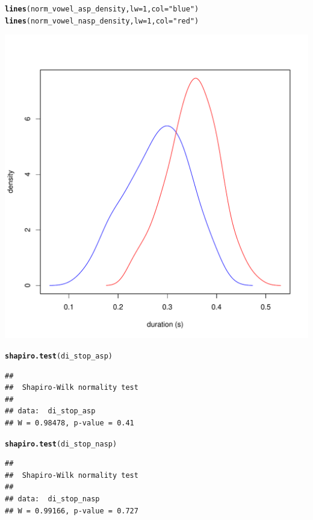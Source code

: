 \documentclass[a4paper,11pt]{article}\usepackage[]{graphicx}\usepackage[]{color}
\makeatletter
\def\maxwidth{ %
  \ifdim\Gin@nat@width>\linewidth
    \linewidth
  \else
    \Gin@nat@width
  \fi
}
\newcommand{\hlnum}[1]{\textcolor[rgb]{0.686,0.059,0.569}{#1}}%
\newcommand{\hlstr}[1]{\textcolor[rgb]{0.192,0.494,0.8}{#1}}%
\newcommand{\hlstd}[1]{\textcolor[rgb]{0.345,0.345,0.345}{#1}}%
\newcommand{\hlkwc}[1]{\textcolor[rgb]{0.333,0.667,0.333}{#1}}%
\newcommand{\hlkwd}[1]{\textcolor[rgb]{0.737,0.353,0.396}{\textbf{#1}}}%
\newenvironment{kframe}{%
 \def\at@end@of@kframe{}%
 \ifinner\ifhmode%
  \def\at@end@of@kframe{\end{minipage}}%
  \begin{minipage}{\columnwidth}%
 \fi\fi%
 \def\FrameCommand##1{\hskip\@totalleftmargin \hskip-\fboxsep
 \colorbox{shadecolor}{##1}\hskip-\fboxsep
     \hskip-\linewidth \hskip-\@totalleftmargin \hskip\columnwidth}%
 \MakeFramed {\advance\hsize-\width
   \@totalleftmargin\z@ \linewidth\hsize
   \@setminipage}}%
 {\par\unskip\endMakeFramed%
 \at@end@of@kframe}
\newenvironment{knitrout}{}{} %
\makeatother
\begin{document}
\begin{knitrout}
\begin{kframe}
\begin{alltt}
\hlkwd{lines}\hlstd{(norm_vowel_asp_density,} \hlkwc{lw} \hlstd{=} \hlnum{1}\hlstd{,} \hlkwc{col} \hlstd{=} \hlstr{"blue"}\hlstd{)}
\hlkwd{lines}\hlstd{(norm_vowel_nasp_density,} \hlkwc{lw} \hlstd{=} \hlnum{1}\hlstd{,} \hlkwc{col} \hlstd{=} \hlstr{"red"}\hlstd{)}
\end{alltt}
\end{kframe}
\includegraphics[width=\maxwidth]{img/bi-stop-dens-1} 

\end{knitrout}

\begin{knitrout}
\color{fgcolor}\begin{kframe}
\begin{alltt}
\hlkwd{shapiro.test}\hlstd{(di_stop_asp)}
\end{alltt}
\begin{verbatim}
## 
## 	Shapiro-Wilk normality test
## 
## data:  di_stop_asp
## W = 0.98478, p-value = 0.41
\end{verbatim}
\begin{alltt}
\hlkwd{shapiro.test}\hlstd{(di_stop_nasp)}
\end{alltt}
\begin{verbatim}
## 
## 	Shapiro-Wilk normality test
## 
## data:  di_stop_nasp
## W = 0.99166, p-value = 0.727
\end{verbatim}
\end{kframe}
\end{knitrout}
\end{document}
